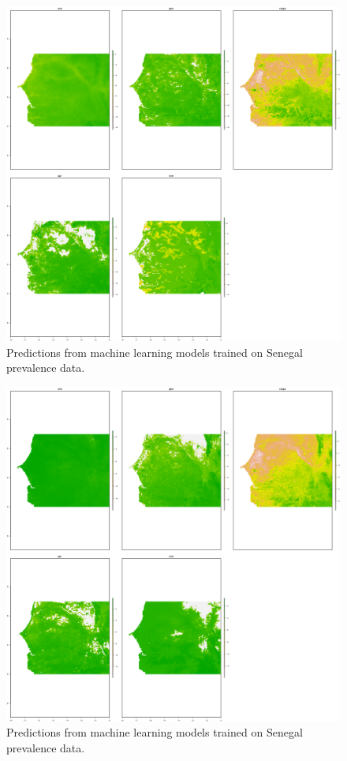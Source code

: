 \documentclass[review]{elsarticle}
\begin{document}
\begin{figure}[h!]
  \centering
  \includegraphics[width=1\textwidth]{figs/SI/sen_all_ml.png}
\caption{
  Predictions from machine learning models trained on Senegal prevalence data.
}

\end{figure}


\begin{figure}[h!]
  \centering
  \includegraphics[width=1\textwidth]{figs/SI/sen_all_globalml.png}
\caption{
  Predictions from machine learning models trained on Senegal prevalence data.
}

\end{figure}
\end{document}
